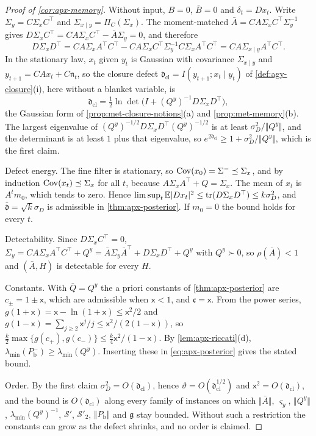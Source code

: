 \begin{proof}[Proof of \cref{cor:apx-memory}]
Without input, $B=0$, $\bar B=0$ and $\delta_t=Dx_t$. Write $\Sigma_y=C\Sigma_xC^\top$ and $\Sigma_{x\mid y}=\Pi_C(\Sigma_x)$. The moment-matched $\bar A=CA\Sigma_xC^\top\Sigma_y^{-1}$ gives $D\Sigma_xC^\top=CA\Sigma_xC^\top-\bar A\Sigma_y=0$, and therefore
\begin{equation*}
D\Sigma_xD^\top=CA\Sigma_xA^\top C^\top-CA\Sigma_xC^\top\Sigma_y^{-1}C\Sigma_xA^\top C^\top=CA\Sigma_{x\mid y}A^\top C^\top .
\end{equation*}
In the stationary law, $x_t$ given $y_t$ is Gaussian with covariance $\Sigma_{x\mid y}$ and $y_{t+1}=CAx_t+C\mathfrak n_t$, so the closure defect $\mathfrak d_{\mathrm{cl}}=I(y_{t+1};x_t\mid y_t)$ of \cref{def:agy-closure}(i), here without a blanket variable, is
\begin{equation*}
\mathfrak d_{\mathrm{cl}}=\tfrac12\ln\det\bigl(I+(Q^y)^{-1}D\Sigma_xD^\top\bigr),
\end{equation*}
the Gaussian form of \cref{prop:met-closure-notions}(a) and \cref{prop:met-memory}(b). The largest eigenvalue of $(Q^y)^{-1/2}D\Sigma_xD^\top(Q^y)^{-1/2}$ is at least $\sigma_D^2/\Vert Q^y\Vert$, and the determinant is at least $1$ plus that eigenvalue, so $e^{2\mathfrak d_{\mathrm{cl}}}\ge1+\sigma_D^2/\Vert Q^y\Vert$, which is the first claim.

Defect energy. The fine filter is stationary, so $\operatorname{Cov}(x_0)=\Sigma^-\preceq\Sigma_x$, and by induction $\operatorname{Cov}(x_t)\preceq\Sigma_x$ for all $t$, because $A\Sigma_xA^\top+Q=\Sigma_x$. The mean of $x_t$ is $A^tm_0$, which tends to zero. Hence $\limsup_t\mathbb{E}\lvert Dx_t\rvert^2\le\operatorname{tr}(D\Sigma_xD^\top)\le k\sigma_D^2$, and $\bar{\mathfrak d}=\sqrt k\sigma_D$ is admissible in \cref{thm:apx-posterior}. If $m_0=0$ the bound holds for every $t$.

Detectability. Since $D\Sigma_xC^\top=0$, $\Sigma_y=CA\Sigma_xA^\top C^\top+Q^y=\bar A\Sigma_y\bar A^\top+D\Sigma_xD^\top+Q^y$ with $Q^y\succ0$, so $\rho(\bar A)<1$ and $(\bar A,H)$ is detectable for every $H$.

Constants. With $\bar Q=Q^y$ the a priori constants of \cref{thm:apx-posterior} are $c_\pm=1\pm\mathsf x$, which are admissible when $\mathsf x<1$, and $\mathfrak c=\mathsf x$. From the power series, $g(1+\mathsf x)=\mathsf x-\ln(1+\mathsf x)\le\mathsf x^2/2$ and $g(1-\mathsf x)=\sum_{j\ge2}\mathsf x^j/j\le\mathsf x^2/(2(1-\mathsf x))$, so $\frac k2\max\{g(c_+),g(c_-)\}\le\frac k4\mathsf x^2/(1-\mathsf x)$. By \cref{lem:apx-riccati}(d), $\lambda_{\min}(P^-_{\mathrm b})\ge\lambda_{\min}(Q^y)$. Inserting these in \cref{eq:apx-posterior} gives the stated bound.

Order. By the first claim $\sigma_D^2=O(\mathfrak d_{\mathrm{cl}})$, hence $\vartheta=O(\mathfrak d_{\mathrm{cl}}^{1/2})$ and $\mathsf x^2=O(\mathfrak d_{\mathrm{cl}})$, and the bound is $O(\mathfrak d_{\mathrm{cl}})$ along every family of instances on which $\Vert\bar A\Vert$, $\varsigma_y$, $\Vert Q^y\Vert$, $\lambda_{\min}(Q^y)^{-1}$, $\mathcal S'$, $\mathcal S'_2$, $\Vert P_{\mathrm b}\Vert$ and $\mathfrak g$ stay bounded. Without such a restriction the constants can grow as the defect shrinks, and no order is claimed.
\end{proof}

